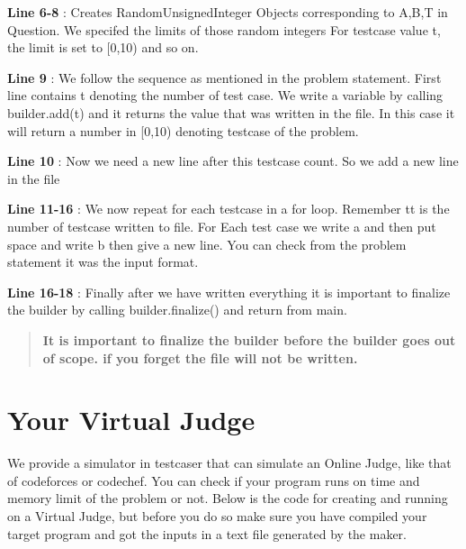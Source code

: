 {\bfseries Line 6-\/8 } \+: Creates Random\+Unsigned\+Integer Objects corresponding to A,B,T in Question. We specifed the limits of those random integers For testcase value t, the limit is set to \mbox{[}0,10) and so on.

{\bfseries Line 9 } \+: We follow the sequence as mentioned in the problem statement. First line contains t denoting the number of test case. We write a variable by calling {\ttfamily builder.\+add(t)} and it returns the value that was written in the file. In this case it will return a number in \mbox{[}0,10) denoting testcase of the problem.

{\bfseries Line 10} \+: Now we need a new line after this testcase count. So we add a new line in the file

{\bfseries Line 11-\/16 } \+: We now repeat for each testcase in a for loop. Remember {\ttfamily tt} is the number of testcase written to file. For Each test case we write \textquotesingle{}a\textquotesingle{} and then put space and write \textquotesingle{}b\textquotesingle{} then give a new line. You can check from the problem statement it was the input format.

{\bfseries Line 16-\/18 } \+: Finally after we have written everything it is important to finalize the builder by calling {\ttfamily builder.\+finalize()} and return from main.

\begin{quote}
{\bfseries It is important to finalize the builder before the builder goes out of scope. if you forget the file will not be written. } \end{quote}


\hypertarget{index_virtual_judge}{}\section{Your Virtual Judge}\label{index_virtual_judge}
We provide a simulator in testcaser that can simulate an Online Judge, like that of codeforces or codechef. You can check if your program runs on time and memory limit of the problem or not. Below is the code for creating and running on a Virtual Judge, but before you do so make sure you have compiled your target program and got the inputs in a text file generated by the maker.


